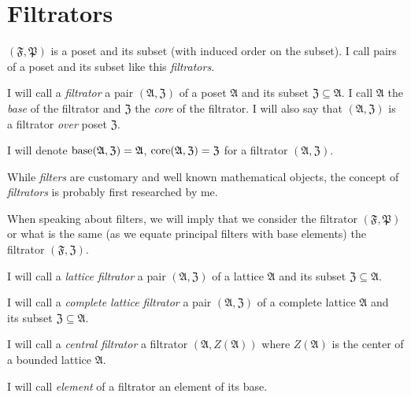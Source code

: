 \section{Filtrators}

$(\mathfrak{F},\mathfrak{P})$ is a poset and its subset (with induced
order on the subset). I call pairs of a poset and its subset like
this \emph{filtrators}.
\begin{defn}
I will call a \emph{filtrator} a pair $(\mathfrak{A},\mathfrak{Z})$
of a poset $\mathfrak{A}$ and its subset $\mathfrak{Z}\subseteq\mathfrak{A}$.
I call $\mathfrak{A}$ the \emph{base} of the filtrator and $\mathfrak{Z}$
the \emph{core} of the filtrator. I will also say that $(\mathfrak{A},\mathfrak{Z})$
is a filtrator \emph{over} poset $\mathfrak{Z}$.

I will denote $\operatorname{base}(\mathfrak{A},\mathfrak{Z})=\mathfrak{A}$, $\operatorname{core}(\mathfrak{A},\mathfrak{Z})=\mathfrak{Z}$
for a filtrator $(\mathfrak{A},\mathfrak{Z})$.
\end{defn}

While \emph{filters} are customary and well known mathematical objects,
the concept of \emph{filtrators} is probably first researched by me.

When speaking about filters, we will imply that we consider the filtrator
$(\mathfrak{F},\mathfrak{P})$ or what is the same (as we equate principal
filters with base elements) the filtrator $(\mathfrak{F},\mathfrak{Z})$.


\begin{defn}
I will call a \emph{lattice filtrator} a
pair $(\mathfrak{A},\mathfrak{Z})$ of a lattice $\mathfrak{A}$ and
its subset $\mathfrak{Z}\subseteq\mathfrak{A}$.
\end{defn}

\begin{defn}
I will call a \emph{complete lattice
filtrator} a pair $(\mathfrak{A},\mathfrak{Z})$ of a complete lattice
$\mathfrak{A}$ and its subset $\mathfrak{Z}\subseteq\mathfrak{A}$.
\end{defn}

\begin{defn}
I will call a \emph{central filtrator} a
filtrator $(\mathfrak{A},Z(\mathfrak{A}))$ where $Z(\mathfrak{A})$
is the center of a bounded lattice $\mathfrak{A}$.
\end{defn}

\begin{defn}
I will call \emph{element} of a filtrator
an element of its base.
\end{defn}

